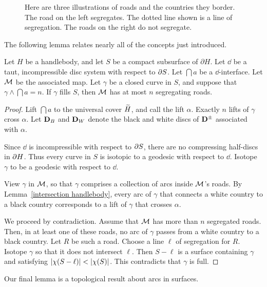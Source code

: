 \begin{figure}
\caption{Here are three illustrations of roads and the countries they border.  The road on the left segregates.  The dotted line shown is a line of segregation.  The roads on the right do not segregate.
}
\label{segregation}
\end{figure}

The following lemma relates nearly all of the concepts just introduced.

\begin{lemma}
\label{segregated regions}
Let $H$ be a handlebody, and let $S$ be a compact subsurface of $\partial H$.
Let $\dd$ be a taut, incompressible disc system with respect to $\partial S$.  Let $\dint{a}$ be a $\dd$-interface.  Let $\mathcal{M}$ be the associated map.  Let $\gamma$ be a closed curve in $S$, and suppose that $\gamma\wedge\dint{a}=n$.  If $\gamma$ fills $S$, then $\mathcal{M}$ has at most $n$ segregating roads.
\end{lemma}

\begin{proof}
Lift $\dint{a}$ to the universal cover $\widetilde{H}$, and call the lift $\alpha$.  Exactly $n$ lifts of $\gamma$ cross $\alpha$.  Let $\mathbf{D}_B$ and $\mathbf{D}_W$ denote the black and white discs of $\mathbf{D}^\pm$ associated with $\alpha$.

Since $\dd$ is incompressible with respect to $\partial S$, there are no compressing half-discs in $\partial H$.  Thus every curve in $S$ is isotopic to a geodesic with respect to $\dd$.  Isotope $\gamma$ to be a geodesic with respect to $\dd$.

View $\gamma$ in $\mathcal{M}$, so that $\gamma$ comprises a collection of arcs inside $\mathcal{M}$'s roads.  By Lemma~\ref{intersection handlebody}, every arc of $\gamma$ that connects a white country to a black country corresponds to a lift of $\gamma$ that crosses $\alpha$.

We proceed by contradiction.  Assume that $\mathcal{M}$ has more than $n$ segregated roads.  Then, in at least one of these roads, no arc of $\gamma$ passes from a white country to a black country.  Let $R$ be such a road.  Choose a line $\ell$ of segregation for $R$.  Isotope $\gamma$ so that it does not intersect $\ell$.  Then $S-\ell$ is a surface containing $\gamma$ and satisfying $\ec{S-\ell}<\ec{S}$.  This contradicts that $\gamma$ is full.
\end{proof}

Our final lemma is a topological result about arcs in surfaces.


